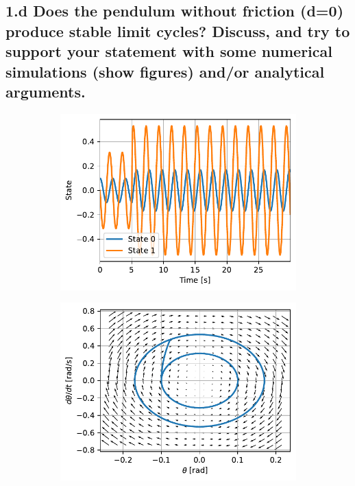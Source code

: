 \documentclass{cmc}
\begin{document}
\subsection*{1.d Does the pendulum without friction (d=0) produce stable limit
  cycles? Discuss, and try to support your statement with some numerical
  simulations (show figures) and/or analytical arguments.}


\begin{figure}[H]
  \centering
  \begin{subfigure}[b]{0.49\textwidth}
    { \centering
      \includegraphics[width=\textwidth]{figures/State_with_perturbation_(x0=[0dot1,_0])}
      \label{fig:pendulum-no-friction-stable-limit-state}
    }
    \caption{}
  \end{subfigure}
  \begin{subfigure}[b]{0.49\textwidth}
    { \centering
      \includegraphics[width=\textwidth]{figures/Phase_with_perturbation_(x0=[0dot1,_0])}
      \label{fig:pendulum-no-friction-stable-limit-phase}
    }
    \caption{}
  \end{subfigure}
  \caption{}
  \label{fig:pendulum-no-friction-stable-limit}
\end{figure}
\end{document}
